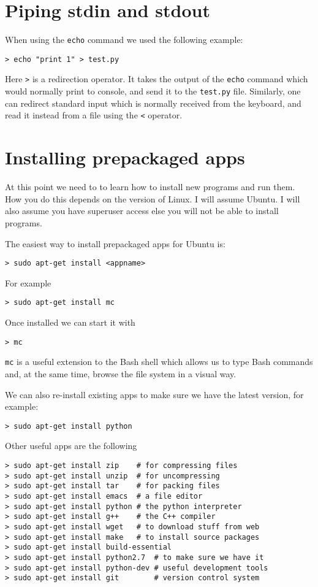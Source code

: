 \documentclass[justified,sixbynine]{tufte-book}
\def\ft{\small\tt}
\theoremstyle{plain}%
\theoremstyle{definition}
\theoremstyle{remark}
\begin{document}
\begin{fullwidth}
\section{Piping stdin and stdout}

When using the {\ft echo} command we used the following example:

\begin{lstlisting}
> echo "print 1" > test.py
\end{lstlisting}
Here {\ft >} is a redirection operator. It takes the output of the {\ft echo} command which would normally print to console, and send it to the {\ft test.py} file. Similarly, one can redirect standard input which is normally received from the keyboard, and read it instead from a file using the {\ft <} operator.

\section{Installing prepackaged apps}

At this point we need to to learn how to install new programs and run them.
How you do this depends on the version of Linux. I will assume Ubuntu. I will also assume you have superuser access else you will not be able to install programs.

The easiest way to install prepackaged apps for Ubuntu is:
\begin{lstlisting}
> sudo apt-get install <appname>
\end{lstlisting}
For example
\begin{lstlisting}
> sudo apt-get install mc
\end{lstlisting}
Once installed we can start it with
\begin{lstlisting}
> mc
\end{lstlisting}
{\ft mc} is a useful extension to the Bash shell which allows us to type Bash commands and, at the same time, browse the file system in a visual way.

We can also re-install existing apps to make sure we have the latest version, for example:
\begin{lstlisting}
> sudo apt-get install python
\end{lstlisting}

Other useful apps are the following
\begin{lstlisting}
> sudo apt-get install zip    # for compressing files
> sudo apt-get install unzip  # for uncompressing
> sudo apt-get install tar    # for packing files
> sudo apt-get install emacs  # a file editor
> sudo apt-get install python # the python interpreter
> sudo apt-get install g++    # the C++ compiler
> sudo apt-get install wget   # to download stuff from web
> sudo apt-get install make   # to install source packages
> sudo apt-get install build-essential
> sudo apt-get install python2.7  # to make sure we have it
> sudo apt-get install python-dev # useful development tools
> sudo apt-get install git        # version control system
\end{lstlisting}


\end{fullwidth}
\end{document}
